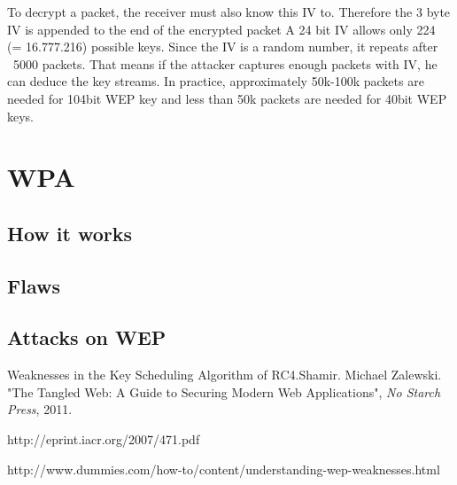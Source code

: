 \documentclass[a4paper,12pt,pagesize,headsepline,bibtotoc,titlepage]{scrartcl}
\begin{document}
To decrypt a packet, the receiver must also know this IV to.
Therefore the 3 byte IV is appended to the end of the encrypted packet
A 24 bit IV allows only 224 (= 16.777.216) possible keys. Since the IV is a random number, it repeats after ~5000 packets.
That means if the attacker captures enough packets with IV, he can deduce the key streams.
In practice, approximately 50k-100k packets are needed for 104bit WEP key and less than 50k packets are needed  for 40bit WEP keys.

\newpage
\section{WPA}
\subsection{How it works}
\subsection{Flaws}
\subsection{Attacks on WEP}
\newpage





\newpage


\begin{thebibliography}{1}

 Weaknesses in the Key Scheduling Algorithm of RC4.Shamir.
Michael Zalewski.
"The Tangled Web: A Guide to Securing Modern Web Applications",
\emph{No Starch Press},
 2011.

http://eprint.iacr.org/2007/471.pdf

http://www.dummies.com/how-to/content/understanding-wep-weaknesses.html

\end{thebibliography}
\end{document}
